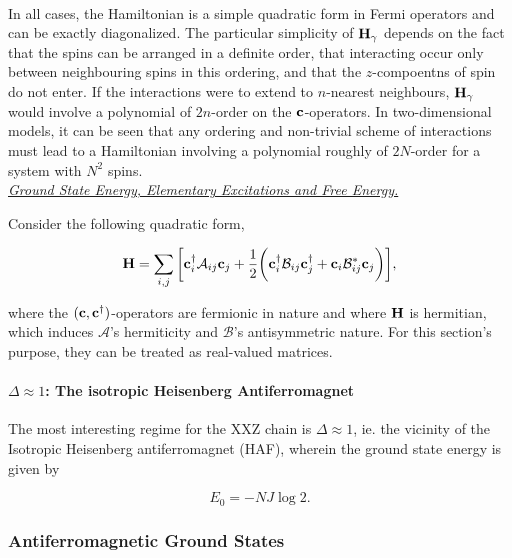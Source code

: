 \documentclass{homework}
\begin{document}
\blanky \\

In all cases, the Hamiltonian is a simple quadratic form in Fermi operators and can be exactly diagonalized. The particular simplicity of ${\bf H}_{\gamma}$ depends on the fact that the spins can be arranged in a definite order, that interacting occur only between neighbouring spins in this ordering, and that the $z$-compoentns of spin do not enter. If the interactions were to extend to $n$-nearest neighbours, ${\bf H}_{\gamma}$ would involve a polynomial of $2n$-order on the ${\bf c}$-operators. In two-dimensional models, it can be seen that any ordering and non-trivial scheme of interactions must lead to a Hamiltonian involving a polynomial roughly of $2N$-order for a system with $N^2$
spins. \\

\textit{\underline{Ground State Energy, Elementary Excitations and Free Energy. }}

Consider the following quadratic form,

\begin{equation}
    \begin{split}
        {\bf H} = \sum_{i,j} \bigg[{\bf c}_i^\dagger \mathcal{A}_{ij} {\bf c}_j + \frac{1}{2} \bigg({\bf c}_i^\dagger \mathcal{B}_{ij} {\bf c}_j^\dagger + {\bf c}_i \mathcal{B}_{ij}^{*} {\bf c}_j \bigg)  \bigg], 
    \end{split}
\end{equation}

where the $({\bf c}, {\bf c}^\dagger)$-operators are fermionic in nature and where ${\bf H}$ is hermitian, which induces $\mathcal{A}$'s hermiticity and ${\mathcal{B}}$'s antisymmetric nature. For this section's purpose, they can be treated as real-valued matrices. 

\clearpage
\paragraph{\textbf{$\Delta \approx 1$: The isotropic Heisenberg Antiferromagnet}}

The most interesting regime for the XXZ chain is $\Delta \approx 1$, ie. the vicinity of the Isotropic Heisenberg antiferromagnet (HAF), wherein the ground state energy is given by 

$$
    E_0 = - N J \log 2.
$$

\clearpage

\subsubsection{Antiferromagnetic Ground States}
\end{document}
